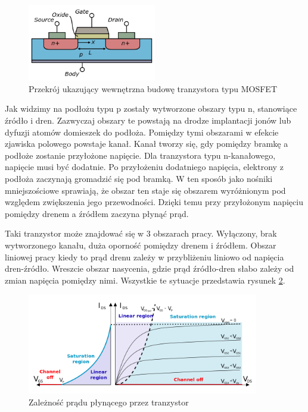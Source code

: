 	\begin{figure}[ht]
	\centering
	\includegraphics[width=0.50\textwidth]{./Rozdzial_3/obrazki/Lateral_mosfet}
	\caption{Przekrój ukazujący wewnętrzna budowę tranzystora typu MOSFET}
	\label{fig:MOSFET}
	\end{figure}

Jak widzimy na podłożu typu p zostały wytworzone obszary typu n, stanowiące źródło i dren. Zazwyczaj obszary te 
powstają na drodze implantacji jonów lub dyfuzji atomów domieszek do podłoża. Pomiędzy tymi obszarami w efekcie 
zjawiska polowego powstaje kanał. Kanał tworzy  się, gdy pomiędzy bramkę a podłoże zostanie przyłożone napięcie. 
Dla tranzystora typu n-kanałowego, napięcie musi być dodatnie. Po przyłożeniu dodatniego napięcia, elektrony 
z podłoża zaczynają gromadzić się pod bramką. W ten sposób jako nośniki mniejszościowe sprawiają, że obszar ten
staje się obszarem wyróżnionym pod względem zwiększenia jego przewodności. Dzięki temu przy przyłożonym napięciu 
pomiędzy drenem a źródłem zaczyna płynąć prąd. 

Taki tranzystor może znajdować się w 3 obszarach pracy. Wyłączony, brak wytworzonego kanału, duża oporność pomiędzy
drenem i źródłem. Obszar liniowej pracy kiedy to prąd drenu zależy w przybliżeniu liniowo od napięcia dren-źródło. 
Wreszcie obszar nasycenia, gdzie prąd źródło-dren słabo zależy od zmian napięcia pomiędzy nimi. Wszystkie te sytuacje
przedstawia rysunek \ref{fig:MOSFET_char}.


	\begin{figure}[ht]
	\centering
	\includegraphics[width=0.90\textwidth]{./Rozdzial_3/obrazki/Charakterystyki_FET}
	\caption{Zależność prądu płynącego przez tranzystor}
	\label{fig:MOSFET_char}
	\end{figure}

